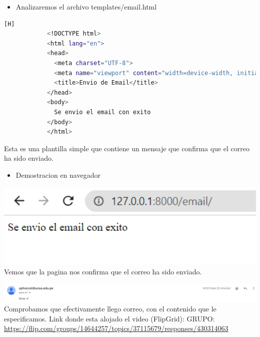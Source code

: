 \documentclass{article}
\begin{document}
         \begin{itemize}
            \item Analizaremos el archivo templates/email.html
        \end{itemize}
        \begin{lstlisting}[language=bash,caption={Archivo SendingEmails/templates/email.html}][H]
            <!DOCTYPE html>
            <html lang="en">
            <head>
              <meta charset="UTF-8">
              <meta name="viewport" content="width=device-width, initial-scale=1.0">
              <title>Envio de Email</title>
            </head>
            <body>
              Se envio el email con exito
            </body>
            </html>
	\end{lstlisting}
         Esta es una plantilla simple que contiene un mensaje que confirma que el correo ha sido enviado.\newline

        \begin{itemize}
            \item Demostracion en navegador\newline
            
        \end{itemize}
        \includegraphics[width=16cm]{img/correoEnviado.png}
        \newline Vemos que la pagina nos confirma que el correo ha sido enviado.

        \includegraphics[width=16cm]{img/correo recibido.png}
        \newline Comprobamos que efectivamente llego correo, con el contenido que le especificamos.
        \newline
        \newline\newline 
        Link donde esta alojado el video (FlipGrid):\newline
        GRUPO:
        \url{https://flip.com/groups/14644257/topics/37115679/responses/430314063}
        
\end{document}
